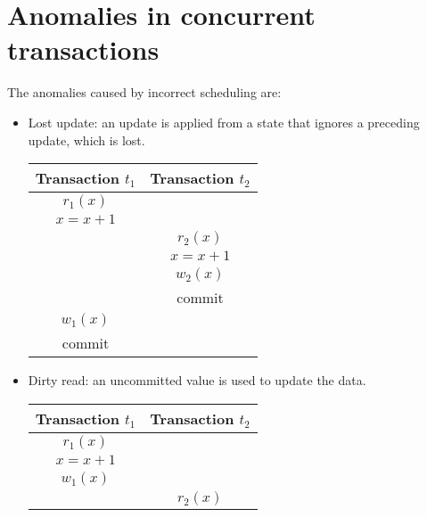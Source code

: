 \section{Anomalies in concurrent transactions}

The anomalies caused by incorrect scheduling are: 
\begin{itemize}
    \item Lost update: an update is applied from a state that ignores a preceding update, which is lost.
        \begin{table}[H]
            \centering
            \begin{tabular}{c|c}
            \textbf{Transaction $t_1$}    & \textbf{Transaction $t_2$} \\ \hline
            $r_1(x)$                      &                            \\
            $x=x+1$                       &                            \\
                                            & $r_2(x)$                   \\
                                            & $x=x+1$                    \\
                                            & $w_2(x)$                   \\
                                            & commit                     \\
            $w_1(x)$                      &                            \\
            commit                        &                           
            \end{tabular}
        \end{table}
    \item Dirty read: an uncommitted value is used to update the data. 
        \begin{table}[H]
            \centering
            \begin{tabular}{c|c}
            \textbf{Transaction $t_1$} & \textbf{Transaction $t_2$} \\ \hline
            $r_1(x)$                   &                            \\
            $x=x+1$                    &                            \\
            $w_1(x)$                   &                            \\
                                    & $r_2(x)$                   \\

\end{tabular}
\end{table}
\end{itemize}
